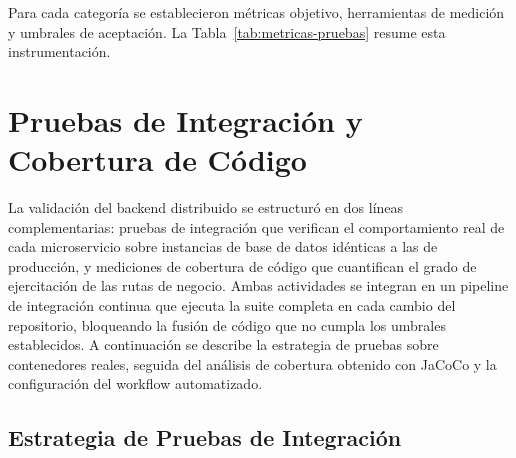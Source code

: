 Para cada categoría se establecieron métricas objetivo, herramientas de medición y
umbrales de aceptación. La Tabla~\ref{tab:metricas-pruebas} resume esta
instrumentación.

\begin{table}[ht!]
\centering
{}
\caption{\textit{Métricas objetivo, herramientas de medición y umbrales de aceptación por categoría de prueba}}
\label{tab:metricas-pruebas}
\end{table}

\section{Pruebas de Integración y Cobertura de Código}

La validación del backend distribuido se estructuró en dos líneas complementarias:
pruebas de integración que verifican el comportamiento real de cada microservicio
sobre instancias de base de datos idénticas a las de producción, y mediciones de
cobertura de código que cuantifican el grado de ejercitación de las rutas de
negocio. Ambas actividades se integran en un pipeline de integración continua que
ejecuta la suite completa en cada cambio del repositorio, bloqueando la fusión de
código que no cumpla los umbrales establecidos. A continuación se describe la
estrategia de pruebas sobre contenedores reales, seguida del análisis de cobertura
obtenido con JaCoCo y la configuración del workflow automatizado.

\subsection{Estrategia de Pruebas de Integración}

